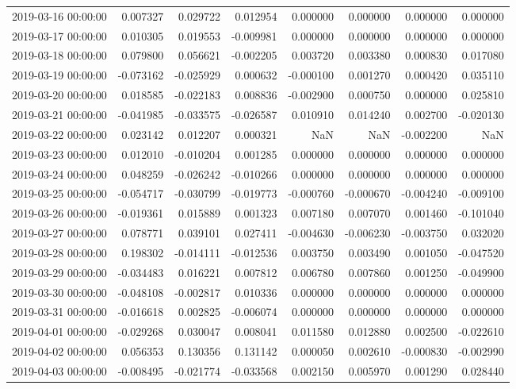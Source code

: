 \begin{tabular}{lrrrrrrr}
2019-03-16 00:00:00 & 0.007327 & 0.029722 & 0.012954 & 0.000000 & 0.000000 & 0.000000 & 0.000000 \\
2019-03-17 00:00:00 & 0.010305 & 0.019553 & -0.009981 & 0.000000 & 0.000000 & 0.000000 & 0.000000 \\
2019-03-18 00:00:00 & 0.079800 & 0.056621 & -0.002205 & 0.003720 & 0.003380 & 0.000830 & 0.017080 \\
2019-03-19 00:00:00 & -0.073162 & -0.025929 & 0.000632 & -0.000100 & 0.001270 & 0.000420 & 0.035110 \\
2019-03-20 00:00:00 & 0.018585 & -0.022183 & 0.008836 & -0.002900 & 0.000750 & 0.000000 & 0.025810 \\
2019-03-21 00:00:00 & -0.041985 & -0.033575 & -0.026587 & 0.010910 & 0.014240 & 0.002700 & -0.020130 \\
2019-03-22 00:00:00 & 0.023142 & 0.012207 & 0.000321 & NaN & NaN & -0.002200 & NaN \\
2019-03-23 00:00:00 & 0.012010 & -0.010204 & 0.001285 & 0.000000 & 0.000000 & 0.000000 & 0.000000 \\
2019-03-24 00:00:00 & 0.048259 & -0.026242 & -0.010266 & 0.000000 & 0.000000 & 0.000000 & 0.000000 \\
2019-03-25 00:00:00 & -0.054717 & -0.030799 & -0.019773 & -0.000760 & -0.000670 & -0.004240 & -0.009100 \\
2019-03-26 00:00:00 & -0.019361 & 0.015889 & 0.001323 & 0.007180 & 0.007070 & 0.001460 & -0.101040 \\
2019-03-27 00:00:00 & 0.078771 & 0.039101 & 0.027411 & -0.004630 & -0.006230 & -0.003750 & 0.032020 \\
2019-03-28 00:00:00 & 0.198302 & -0.014111 & -0.012536 & 0.003750 & 0.003490 & 0.001050 & -0.047520 \\
2019-03-29 00:00:00 & -0.034483 & 0.016221 & 0.007812 & 0.006780 & 0.007860 & 0.001250 & -0.049900 \\
2019-03-30 00:00:00 & -0.048108 & -0.002817 & 0.010336 & 0.000000 & 0.000000 & 0.000000 & 0.000000 \\
2019-03-31 00:00:00 & -0.016618 & 0.002825 & -0.006074 & 0.000000 & 0.000000 & 0.000000 & 0.000000 \\
2019-04-01 00:00:00 & -0.029268 & 0.030047 & 0.008041 & 0.011580 & 0.012880 & 0.002500 & -0.022610 \\
2019-04-02 00:00:00 & 0.056353 & 0.130356 & 0.131142 & 0.000050 & 0.002610 & -0.000830 & -0.002990 \\
2019-04-03 00:00:00 & -0.008495 & -0.021774 & -0.033568 & 0.002150 & 0.005970 & 0.001290 & 0.028440 \\

\end{tabular}
